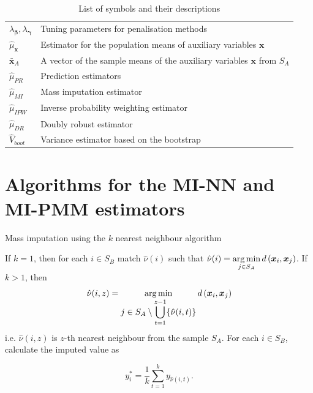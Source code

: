 \documentclass[
]{jss}
\begin{document}
\begin{table}[ht!]
\begin{tabular}{ll}
$\lambda_{\boldsymbol{\beta}}, \lambda_{\boldsymbol{\gamma}}$ & Tuning parameters for penalisation methods \\
$\hat{\mu}_{\boldsymbol{x}}$ & Estimator for the population means of auxiliary variables $\boldsymbol{x}$ \\
$\bar{\boldsymbol{x}}_{A}$ & A vector of the sample means of the auxiliary variables $\boldsymbol{x}$ from $S_A$ \\ 
$\hat{\mu}_{PR}$ & Prediction estimators \\
$\hat{\mu}_{MI}$ & Mass imputation estimator \\
$\hat{\mu}_{IPW}$ & Inverse probability weighting estimator \\
$\hat{\mu}_{DR}$ & Doubly robust estimator \\
$\hat{V}_{boot}$ & Variance estimator based on the bootstrap \\
\hline
\end{tabular}
\caption{List of symbols and their descriptions}
\label{tab-list-of-symbols}
\end{table}

\clearpage

\section{Algorithms for the MI-NN and MI-PMM
estimators}\label{sec-details}

\begin{algorithm}[ht!]
\caption{Mass imputation using the $k$ nearest neighbour algorithm}
\label{algo-2}
\begin{algorithmic}[1]
\State If $k=1$, then for each $i \in S_B$ match $\hat{\nu}(i)$ such that
$\displaystyle \hat{\nu}(i)=
\operatornamewithlimits{arg\,min}_{j\in S_{A}}d\left(\boldsymbol{x}_i,\boldsymbol{x}_j\right)$.
\State If $k>1$, then
$$\hat{\nu}(i, z) = \operatornamewithlimits{arg\,min}_{\displaystyle j\in S_{A}\setminus\bigcup_{t=1}^{z-1}
\{\hat{\nu}(i, t)\}} d\left(\boldsymbol{x}_i, \boldsymbol{x}_j\right)$$
i.e. $\hat{\nu}(i, z)$ is $z$-th nearest neighbour from the sample $S_A$.\;
\State For each $i \in S_B$, calculate the imputed value as

$$
y_i^* = \frac{1}{k}\sum_{t=1}^{k}y_{\hat{\nu}(i, t)}.
$$
\end{algorithmic}
\end{algorithm}
\end{document}
